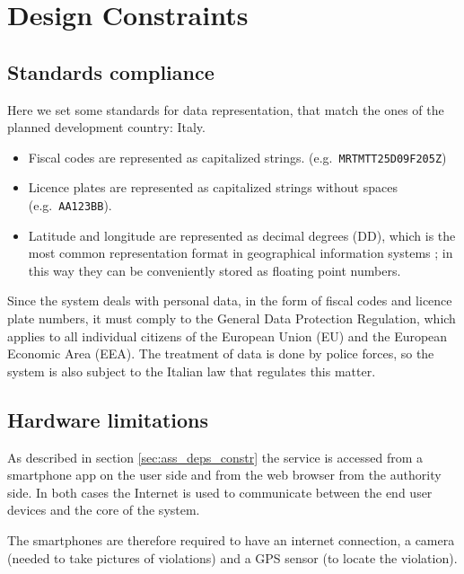 \section{Design Constraints}

\subsection{Standards compliance}
Here we set some standards for data representation, that match the ones of the
planned development country: Italy.
\begin{itemize}
    \item Fiscal codes are represented as capitalized strings.
    (e.g.\ \texttt{MRTMTT25D09F205Z})
    \item Licence plates are represented as capitalized strings without spaces
    (e.g.\ \texttt{AA123BB}).
    \item Latitude and longitude are represented as decimal degrees (DD), which
    is the most common representation format in geographical information systems
    \cite{wiki:decimal-degrees}; in this way they can be conveniently stored as
    floating point numbers.
\end{itemize}

Since the system deals with personal data, in the form of fiscal codes and
licence plate numbers, it must comply to the General Data Protection Regulation,
which applies to all individual citizens of the European Union (EU) and the
European Economic Area (EEA).
The treatment of data is done by police forces, so the system is also subject to
the Italian law \cite[DPR-15/2018]{gu:dpr-15/2018} that regulates this matter.

\subsection{Hardware limitations}
As described in section \ref{sec:ass_deps_constr} the service is accessed
from a smartphone app on the user side and from the web browser from the
authority side. In both cases the Internet is used to communicate between
the end user devices and the core of the system.

The smartphones are therefore required to have an internet connection, a
camera (needed to take pictures of violations) and a GPS sensor (to locate
the violation).

